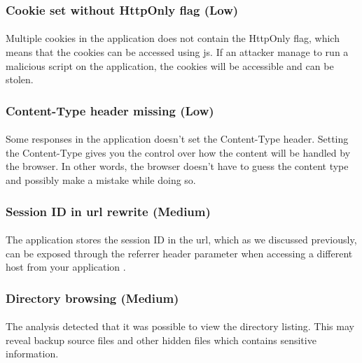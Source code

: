 \documentclass[11pt,english,a4paper]{report}
\begin{document}
\subsubsection{Cookie set without HttpOnly flag (Low)}
\paragraph{}
Multiple cookies in the application does not contain the HttpOnly flag, which means that the cookies can be accessed using \gls{js}.
If an attacker manage to run a malicious script on the application, the cookies will be accessible and can be stolen.

\subsubsection{Content-Type header missing (Low)}
\paragraph{}
Some responses in the application doesn't set the Content-Type header.
Setting the Content-Type gives you the control over how the content will be handled by the browser.
In other words, the browser doesn't have to guess the content type and possibly make a mistake while doing so.

\subsubsection{Session ID in \gls{url} rewrite (Medium)}
\paragraph{}
The application stores the session ID in the \gls{url}, which as we discussed previously, can be exposed through the referrer header parameter when accessing a different host from your application \cite{url-sessionid-risks}.

\subsubsection{Directory browsing (Medium)}
\paragraph{}
The analysis detected that it was possible to view the directory listing.
This may reveal backup source files and other hidden files which contains sensitive information.
\end{document}
